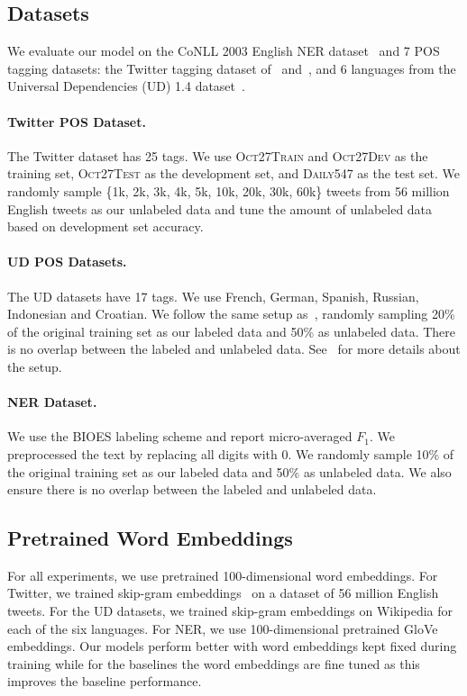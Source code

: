 \documentclass[11pt,a4paper]{article}
\newcommand{\klcomment}[1]{\textcolor{magenta}{\bf \small [ #1 --KL]}}
\renewcommand{\klcomment}[1]{}
\begin{document}
\subsection{Datasets}
We evaluate our model on the CoNLL 2003 English NER dataset~\cite{tjong2003introduction} and 7 POS tagging datasets: the Twitter tagging dataset of~\citet{gimpel-11a} and~\citet{owoputi-13}, and 6 languages from the Universal Dependencies (UD) 1.4 dataset~\cite{mcdonald2013universal}.

\paragraph{Twitter POS Dataset.} The Twitter dataset has 25 tags. We use \textsc{Oct27Train} and \textsc{Oct27Dev} as the training set, \textsc{Oct27Test} as the development set, and \textsc{Daily547} as the test set. We randomly sample \{1k, 2k, 3k, 4k, 5k, 10k, 20k, 30k, 60k\} tweets from 56 million English tweets as our unlabeled data and tune the amount of unlabeled data based on development set accuracy.
\paragraph{UD POS Datasets.} The UD datasets have 17 tags. We use French, German, Spanish, Russian, Indonesian and Croatian. We follow the same setup as~\citet{zhang2017semi}, randomly sampling 20\% of the original training set as our labeled data and 50\% as unlabeled data. There is no overlap between the labeled and unlabeled data. See~\citet{zhang2017semi} for more details about the setup.
\paragraph{NER Dataset.} We use the BIOES labeling scheme and report micro-averaged $F_{1}$.
We preprocessed the text by replacing all digits with 0. We randomly sample 10\% of the original training set as our labeled data and 50\% as unlabeled data. We also ensure there is no overlap between the labeled and unlabeled data.

\subsection{Pretrained Word Embeddings}
For all experiments, we use pretrained 100-dimensional word embeddings. For Twitter, we trained skip-gram embeddings~\cite{mikolov2013efficient} on a dataset of 56 million English tweets.
For the UD datasets, we trained skip-gram embeddings on Wikipedia for each of the six languages. For NER, we use 100-dimensional pretrained GloVe~\cite{pennington2014glove} embeddings. Our models perform better with word embeddings kept fixed during training while for the baselines the word embeddings are fine tuned as this improves the baseline performance.\klcomment{added "as this..."}
\end{document}
